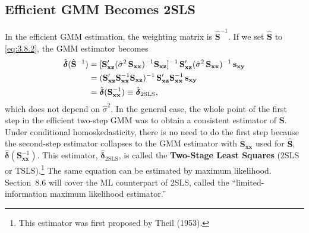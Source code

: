 \subsection*{Efficient GMM Becomes 2SLS}

In the efficient GMM estimation, the weighting matrix is $\hat{\mathbf{S}}^{-1}$.  If we set
$\hat{\mathbf{S}}$ to \eqref{eq:3.8.2}, the GMM estimator becomes
\begin{align}
  \hat{\boldsymbol{\delta}}(\hat{\mathbf{S}}^{-1})
  &= [\mathbf{S}_{\mathbf{xz}}'(\hat{\sigma}^2\, \mathbf{S}_{\mathbf{xx}})^{-1}
     \mathbf{S}_{\mathbf{xz}}]^{-1}\,
     \mathbf{S}_{\mathbf{xz}}'(\hat{\sigma}^2\, \mathbf{S}_{\mathbf{xx}})^{-1}\,
     \mathbf{s}_{\mathbf{xy}} \notag \\
  &= (\mathbf{S}_{\mathbf{xz}}' \mathbf{S}_{\mathbf{xx}}^{-1}
     \mathbf{S}_{\mathbf{xz}})^{-1}\,
     \mathbf{S}_{\mathbf{xz}}' \mathbf{S}_{\mathbf{xx}}^{-1}\,
     \mathbf{s}_{\mathbf{xy}} \notag \\
  &= \hat{\boldsymbol{\delta}}(\mathbf{S}_{\mathbf{xx}}^{-1})
  \equiv \hat{\boldsymbol{\delta}}_{\text{2SLS}},
  \label{eq:3.8.3}
\end{align}
which does not depend on $\hat{\sigma}^2$.  In the general case, the whole point of the first step in
the efficient two-step GMM was to obtain a consistent estimator of $\mathbf{S}$.  Under conditional
homoskedasticity, there is no need to do the first step because the second-step
estimator collapses to the GMM estimator with $\mathbf{S}_{\mathbf{xx}}$ used for $\hat{\mathbf{S}}$,
$\hat{\boldsymbol{\delta}}(\mathbf{S}_{\mathbf{xx}}^{-1})$.  This
estimator, $\hat{\boldsymbol{\delta}}_{\text{2SLS}}$, is called the \textbf{Two-Stage Least Squares}
(2SLS or TSLS).\footnote{This estimator was first proposed by Theil (1953).}
The same equation can be estimated by maximum likelihood.  Section~8.6 will cover
the ML counterpart of 2SLS, called the ``limited-information maximum likelihood
estimator.''

